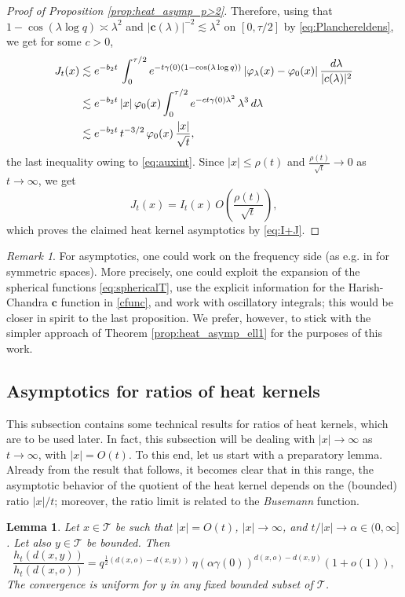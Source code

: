 \documentclass[10pt,a4paper]{amsart}
\renewcommand\mathcal{\mathscr}
\def\int{\intop\nolimits}
\theoremstyle{plain}
\newtheorem{lemma}[theorem]{Lemma}
\theoremstyle{remark}
\newtheorem{remark}[theorem]{Remark}
\theoremstyle{definition}
\begin{document}
\begin{proof}[Proof of Proposition \ref{prop:heat_asymp_p>2}]
		Therefore, using that $1-\cos(\lambda \log q)\asymp \lambda^2$ and  $|\textbf{c}(\lambda)|^{-2}\lesssim \lambda^2$ on $[0, \tau/2]$ by \eqref{eq:Planchereldens}, we get for some $c>0$,
		\begin{align*}
			J_t(x)&\lesssim e^{-b_2t}\, \int_{0}^{\tau /2}e^{-t\gamma(0)(1-\cos(\lambda\log q))}\left|\varphi_{\lambda}(x)-\varphi_0(x)\right|\frac{d \lambda}{|\textbf{c}(\lambda)|^2}\\
			&\lesssim e^{-b_2t}\, |x|\, \varphi_0(x)\int_{0}^{\tau /2}e^{-ct\gamma(0)\lambda^2}\, \lambda^3\, d\lambda\\
			&\lesssim e^{-b_2t}\,t^{-3/2}\, \varphi_0(x)\, \frac{|x|}{\sqrt{t}},
		\end{align*}
		the last inequality owing to \eqref{eq:auxint}. Since $|x|\leq \rho(t)$ and $\frac{\rho(t)}{\sqrt{t}}\to 0$ as $t\to \infty$, we get
		$$J_t(x)=I_t(x)\, O\left(\frac{\rho(t)}{\sqrt{t}}\right),$$
		which proves the claimed heat kernel asymptotics  by \eqref{eq:I+J}.
	\end{proof}
	
\begin{remark} 
For asymptotics, one could work on the frequency side (as e.g. in \cite[Section 5]{AJ99} for symmetric spaces). More precisely, one could exploit the expansion of the spherical functions \eqref{eq:sphericalT}, use the explicit information for the Harish-Chandra $\textbf{c}$ function in \eqref{cfunc}, and work with oscillatory integrals; this would be closer in spirit to the last proposition. We prefer, however, to stick with the simpler approach of Theorem \ref{prop:heat_asymp_ell1} for the purposes of this work.
\end{remark}


	\subsection{Asymptotics for ratios of heat kernels}
	This subsection contains some technical results for ratios of heat kernels, which are to be used later. In fact, this subsection will be dealing with $|x|\to \infty$ as $t\to \infty$, with $|x|=O(t)$. To this end, let us start with a preparatory lemma. Already from the result that follows, it becomes clear that in this range, the asymptotic behavior of the quotient of the heat kernel depends on the (bounded) ratio $|x|/t$; moreover, the ratio limit is related to the \textit{Busemann} function.


   \begin{lemma}\label{lemma:quotient_prep}
    Let $x\in \mathcal{T}$ be such that $|x|=O(t)$, $|x|\to \infty$, and $t/|x|\to \alpha \in (0, \infty]$. Let also $y\in \mathcal{T}$ be bounded. Then
\[
\frac{h_t(d(x,y))}{h_t(d(x,o))}=q^{\frac{1}{2}(d(x,o)-d(x,y))}\, \eta(\alpha \gamma(0))^{d(x,o)-d(x,y)}(1+o(1)),
\]
The convergence is uniform for $y$ in any fixed bounded subset of $\mathcal T$.
    \end{lemma}
\end{document}
